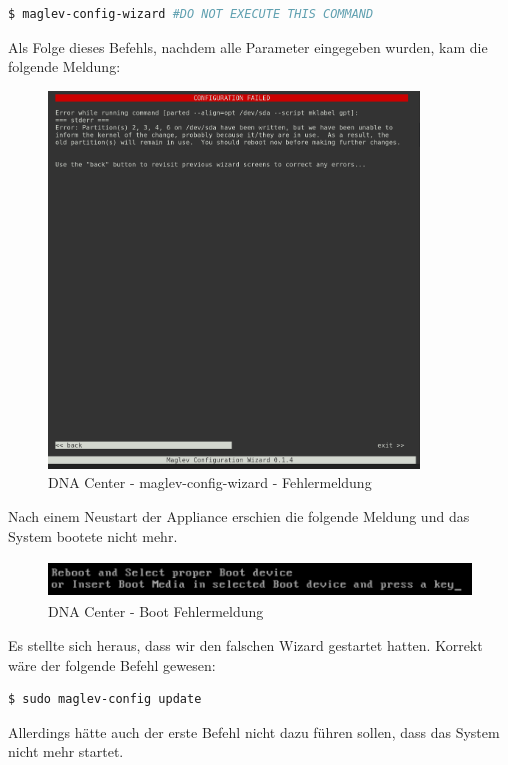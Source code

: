 \begin{lstlisting}[language=bash]
$ maglev-config-wizard #DO NOT EXECUTE THIS COMMAND
\end{lstlisting}

Als Folge dieses Befehls, nachdem alle Parameter eingegeben wurden, kam die folgende Meldung:

\begin{figure}[H]
	\centering
	\includegraphics[height=10cm]{img/dna-center-reset-fail-1.png}
	\caption{DNA Center - maglev-config-wizard - Fehlermeldung}
	\label{fig:dna-center-reset-1}
\end{figure}

Nach einem Neustart der Appliance erschien die folgende Meldung und das System bootete nicht mehr. 
\begin{figure}[H]
	\centering
	\includegraphics[height=1cm]{img/dna-center-reset-fail-2.png}
	\caption{DNA Center - Boot Fehlermeldung}
	\label{fig:dna-center-reset-2}
\end{figure}

Es stellte sich heraus, dass wir den falschen Wizard gestartet hatten.
Korrekt wäre der folgende Befehl gewesen:

\begin{lstlisting}[language=bash]
$ sudo maglev-config update
\end{lstlisting}

Allerdings hätte auch der erste Befehl nicht dazu führen sollen, dass das System nicht mehr startet.

